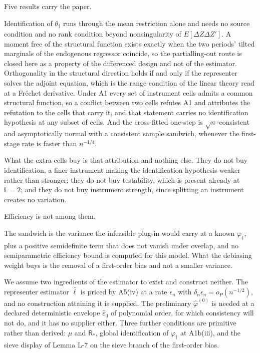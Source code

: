 \documentclass[
  12pt]{article}
\newcommand{\1}[1]{\mathds{1}\left[#1\right]}
\theoremstyle{plain}
\theoremstyle{definition}
\theoremstyle{definition}
\theoremstyle{remark}
\newcommand{\vdagger}{\varphi_{\dagger}}
\begin{document}
Five results carry the paper.

Identification of \(\theta_\dagger\) runs through the mean restriction
alone and needs no source condition and no rank condition beyond
nonsingularity of \(E[\Delta Z\Delta Z']\). A moment free of the
structural function exists exactly when the two periods' tilted
marginals of the endogenous regressor coincide, so the partialling-out
route is closed here as a property of the differenced design and not of
the estimator. Orthogonality in the structural direction holds if and
only if the representer solves the adjoint equation, which is the range
condition of the linear theory read at a Fréchet derivative. Under A1
every set of instrument cells admits a common structural function, so a
conflict between two cells refutes A1 and attributes the refutation to
the cells that carry it, and that statement carries no identification
hypothesis at any subset of cells. And the cross-fitted one-step is
\(\sqrt n\)-consistent and asymptotically normal with a consistent
sample sandwich, whenever the first-stage rate is faster than
\(n^{-1/4}\).

What the extra cells buy is that attribution and nothing else. They do
not buy identification, a finer instrument making the identification
hypothesis weaker rather than stronger; they do not buy testability,
which is present already at \(\mathsf L=2\); and they do not buy
instrument strength, since splitting an instrument creates no variation.

Efficiency is not among them.

The sandwich is the variance the infeasible plug-in would carry at a
known \(\vdagger\), plus a positive semidefinite term that does not
vanish under overlap, and no semiparametric efficiency bound is computed
for this model. What the debiasing weight buys is the removal of a
first-order bias and not a smaller variance.

We assume two ingredients of the estimator to exist and construct
neither. The representer estimator \(\hat\ell\) is priced by A5(iv) at a
rate \(\epsilon_n\) with \(\delta_n\epsilon_n=o_P(n^{-1/2})\), and no
construction attaining it is supplied. The preliminary
\(\hat\varphi^{(0)}\) is needed at a declared deterministic envelope
\(\hat\varepsilon_0\) of polynomial order, for which consistency will
not do, and it has no supplier either. Three further conditions are
primitive rather than derived: \(\mu\) and \(\mathsf R_\ast\), global
identification of \(\vdagger\) at A1b(iii), and the sieve display of
Lemma L-7 on the sieve branch of the first-order bias.
\end{document}
